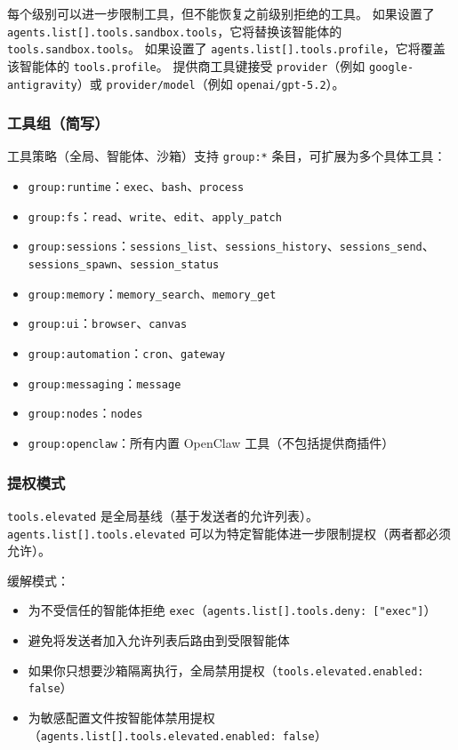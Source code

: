 每个级别可以进一步限制工具，但不能恢复之前级别拒绝的工具。
如果设置了 \texttt{agents.list[].tools.sandbox.tools}，它将替换该智能体的 \texttt{tools.sandbox.tools}。
如果设置了 \texttt{agents.list[].tools.profile}，它将覆盖该智能体的 \texttt{tools.profile}。
提供商工具键接受 \texttt{provider}（例如 \texttt{google-antigravity}）或 \texttt{provider/model}（例如 \texttt{openai/gpt-5.2}）。

\subsubsection{工具组（简写）}


工具策略（全局、智能体、沙箱）支持 \texttt{group:*} 条目，可扩展为多个具体工具：

\begin{itemize}
  \item \texttt{group:runtime}：\texttt{exec}、\texttt{bash}、\texttt{process}
  \item \texttt{group:fs}：\texttt{read}、\texttt{write}、\texttt{edit}、\texttt{apply\_patch}
  \item \texttt{group:sessions}：\texttt{sessions\_list}、\texttt{sessions\_history}、\texttt{sessions\_send}、\texttt{sessions\_spawn}、\texttt{session\_status}
  \item \texttt{group:memory}：\texttt{memory\_search}、\texttt{memory\_get}
  \item \texttt{group:ui}：\texttt{browser}、\texttt{canvas}
  \item \texttt{group:automation}：\texttt{cron}、\texttt{gateway}
  \item \texttt{group:messaging}：\texttt{message}
  \item \texttt{group:nodes}：\texttt{nodes}
  \item \texttt{group:openclaw}：所有内置 OpenClaw 工具（不包括提供商插件）
\end{itemize}


\subsubsection{提权模式}


\texttt{tools.elevated} 是全局基线（基于发送者的允许列表）。\texttt{agents.list[].tools.elevated} 可以为特定智能体进一步限制提权（两者都必须允许）。

缓解模式：

\begin{itemize}
  \item 为不受信任的智能体拒绝 \texttt{exec}（\texttt{agents.list[].tools.deny: ["exec"]}）
  \item 避免将发送者加入允许列表后路由到受限智能体
  \item 如果你只想要沙箱隔离执行，全局禁用提权（\texttt{tools.elevated.enabled: false}）
  \item 为敏感配置文件按智能体禁用提权（\texttt{agents.list[].tools.elevated.enabled: false}）
\end{itemize}


